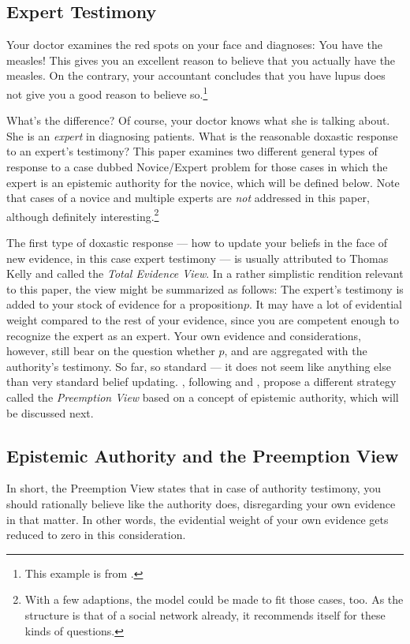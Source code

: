 \documentclass[11pt, a4paper]{scrartcl}
\renewcommand{\i}[1]{\emph{#1}}
\begin{document}
\subsection{Expert Testimony}
Your doctor examines the red spots on your face and diagnoses: You have the measles! This gives you an excellent reason to believe that you actually have the measles. On the contrary, your accountant concludes that you have lupus does not give you a good reason to believe so.\footnote{This example is from \textcite{Constantin2017}.}

What's the difference? Of course, your doctor knows what she is talking about. She is an \i{expert} in diagnosing patients. What is the reasonable doxastic response to an expert's testimony? This paper examines two different general types of response to a case dubbed Novice/Expert problem \parencite{Goldman2001} for those cases in which the expert is an epistemic authority for the novice, which will be defined below. Note that cases of a novice and multiple experts are \i{not} addressed in this paper, although definitely interesting.\footnote{With a few adaptions, the model could be made to fit those cases, too. As the structure is that of a social network already, it recommends itself for these kinds of questions.}

The first type of doxastic response --- how to update your beliefs in the face of new evidence, in this case expert testimony --- is usually attributed to Thomas Kelly \parencite{Kelly2010-KELPDA} and called the \i{Total Evidence View}. In a rather simplistic rendition relevant to this paper, the view might be summarized as follows: The expert's testimony is added to your stock of evidence for a proposition$p$. It may have a lot of evidential weight compared to the rest of your evidence, since you are competent enough to recognize the expert as an expert. Your own evidence and considerations, however, still bear on the question whether $p$, and are aggregated with the authority's testimony. So far, so standard --- it does not seem like anything else than very standard belief updating. \textcite{Constantin2017}, following \textcite{Zagzebski2012-ZAGEAA} and \textcite{Keren2014-KERTAB}, propose a different strategy called the \i{Preemption View} based on a concept of epistemic authority, which will be discussed next.

\subsection{Epistemic Authority and the Preemption View}\label{sec:undercut}
In short, the Preemption View states that in case of authority testimony, you should rationally believe like the authority does, disregarding your own evidence in that matter. In other words, the evidential weight of your own evidence gets reduced to zero in this consideration.
\end{document}
